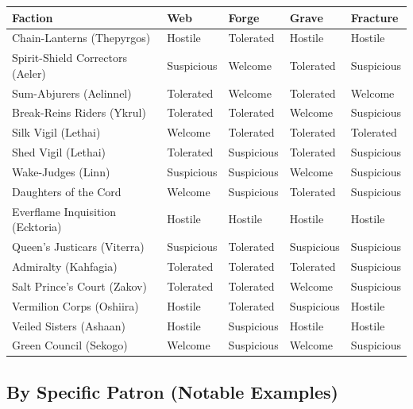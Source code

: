 \begin{table}[h]
\centering
\small
\begin{tabular}{lllll}
\hline
\textbf{Faction} & \textbf{Web} & \textbf{Forge} & \textbf{Grave} & \textbf{Fracture} \\
\hline
Chain-Lanterns (Thepyrgos) & Hostile & Tolerated & Hostile & Hostile \\
Spirit-Shield Correctors (Aeler) & Suspicious & Welcome & Tolerated & Suspicious \\
Sum-Abjurers (Aelinnel) & Tolerated & Welcome & Tolerated & Welcome \\
Break-Reins Riders (Ykrul) & Tolerated & Tolerated & Welcome & Suspicious \\
Silk Vigil (Lethai) & Welcome & Tolerated & Tolerated & Tolerated \\
Shed Vigil (Lethai) & Tolerated & Suspicious & Tolerated & Suspicious \\
Wake-Judges (Linn) & Suspicious & Suspicious & Welcome & Suspicious \\
Daughters of the Cord & Welcome & Suspicious & Tolerated & Suspicious \\
Everflame Inquisition (Ecktoria) & Hostile & Hostile & Hostile & Hostile \\
Queen's Justicars (Viterra) & Suspicious & Tolerated & Suspicious & Suspicious \\
Admiralty (Kahfagia) & Tolerated & Tolerated & Tolerated & Suspicious \\
Salt Prince's Court (Zakov) & Tolerated & Tolerated & Welcome & Suspicious \\
Vermilion Corps (Oshiira) & Hostile & Tolerated & Suspicious & Hostile \\
Veiled Sisters (Ashaan) & Hostile & Suspicious & Hostile & Hostile \\
Green Council (Sekogo) & Welcome & Suspicious & Welcome & Suspicious \\
\hline
\end{tabular}
\end{table}

\subsection*{By Specific Patron (Notable Examples)}

